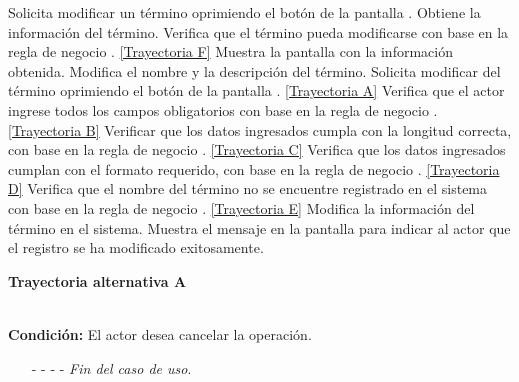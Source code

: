 	\begin{UCtrayectoria}
		\UCpaso[\UCactor] Solicita modificar un término oprimiendo el botón \editar de la pantalla .
		\UCpaso[\UCsist] Obtiene la información del término.
		\UCpaso[\UCsist] Verifica que el término pueda modificarse con base en la regla de negocio . \hyperlink{CU6-2:TAF}{[Trayectoria F]}
		\UCpaso[\UCsist] Muestra la pantalla  con la información obtenida.
		\UCpaso[\UCactor] Modifica el nombre y la descripción del término. \label{CU6.2-P5}
		\UCpaso[\UCactor] Solicita modificar del término oprimiendo el botón  de la pantalla . \hyperlink{CU6-2:TAB}{[Trayectoria A]}
		\UCpaso[\UCsist] Verifica que el actor ingrese todos los campos obligatorios con base en la regla de negocio . \hyperlink{CU6-2:TAB}{[Trayectoria B]}
		\UCpaso[\UCsist] Verificar que los datos ingresados cumpla con la longitud correcta, con base en la regla de negocio . \hyperlink{CU6-2:TAC}{[Trayectoria C]}
		\UCpaso[\UCsist] Verifica que los datos ingresados cumplan con el formato requerido, con base en la regla de negocio . \hyperlink{CU6-2:TAD}{[Trayectoria D]}
		\UCpaso[\UCsist] Verifica que el nombre del término no se encuentre registrado en el sistema con base en la regla de negocio . \hyperlink{CU6-2:TAE}{[Trayectoria E]}
		\UCpaso[\UCsist] Modifica la información del término en el sistema.
		\UCpaso[\UCsist] Muestra el mensaje  en la pantalla  para indicar al actor que el registro se ha modificado exitosamente.
	\end{UCtrayectoria}		
	\hypertarget{CU6-2:TAA}{\textbf{Trayectoria alternativa A}}\\
	\noindent \textbf{Condición:} El actor desea cancelar la operación.
	\begin{enumerate}
		\UCpaso[\UCactor] Solicita cancelar la operación oprimiendo el botón  de la pantalla 
		\UCpaso[\UCsist] Muestra la pantalla .
		\item[- -] - - {\em {Fin del caso de uso}}.%
	\end{enumerate}
